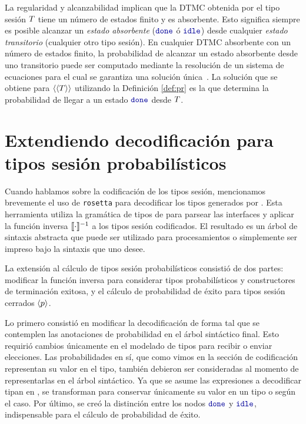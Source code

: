 La regularidad y alcanzabilidad implican que la DTMC obtenida por el tipo
sesión $T$ tiene un número de estados finito y es absorbente. Esto
significa siempre es posible alcanzar un \emph{estado absorbente} ($\Done$ ó
$\Idle$) desde cualquier \emph{estado transitorio} (cualquier otro tipo sesión).
En cualquier DTMC absorbente con un número de estados finito, la probabilidad
de alcanzar un estado absorbente desde uno transitorio puede ser computado
mediante la resolución de un sistema de ecuaciones para el cual se garantiza
una solución única~\cite{KemenySnell}. La solución que se obtiene para
$\langle\langle T\rangle\rangle$ utilizando la Definición \ref{def:pr} es la que determina
la probabilidad de llegar a un estado $\Done$ desde $T$.

\section{Extendiendo decodificación para tipos sesión probabilísticos}

Cuando hablamos sobre la codificación de los tipos sesión, mencionamos
brevemente el uso de \texttt{rosetta} para decodificar los tipos generados por
\OCaml. Esta herramienta utiliza la gramática de tipos de \OCaml para parsear
las interfaces y aplicar la función inversa $\llbracket\cdot\rrbracket^{-1}$ a los tipos sesión
codificados. El resultado es un árbol de sintaxis abstracta que puede ser
utilizado para procesamientos o simplemente ser impreso bajo la sintaxis que
uno desee.

La extensión al cálculo de tipos sesión probabilísticos consistió de dos
partes: modificar la función inversa para considerar tipos probabilísticos y
constructores de terminación exitosa, y el cálculo de probabilidad de éxito
para tipos sesión cerrados $\langle p \rangle$.

Lo primero consistió en modificar la decodificación de forma tal que se
contemplen las anotaciones de probabilidad en el árbol sintáctico final. Esto
requirió cambios únicamente en el modelado de tipos para recibir o enviar
elecciones. Las probabilidades en sí, que como vimos en la sección de
codificación representan su valor en el tipo, también debieron ser consideradas
al momento de representarlas en el árbol sintáctico. Ya que se asume las
expresiones a decodificar tipan en \OCaml, se transforman para conservar
únicamente su valor en un tipo  o  según el caso. Por último,
se creó la distinción entre los nodos $\Done$ y $\Idle$, indispensable para el
cálculo de probabilidad de éxito.

